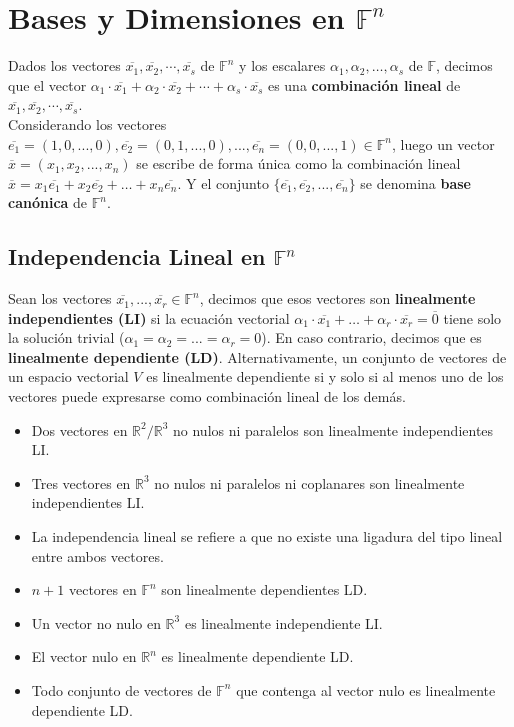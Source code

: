 \documentclass[11pt,a4paper]{article}
\begin{document}
\newpage

\section{Bases y Dimensiones en $\mathbb{F}^n$}
Dados los vectores $\overline{x_1}, \overline{x_2}, \cdots, \overline{x_s}$ de $\mathbb{F}^n$ y los escalares $\alpha_1, \alpha_2, \hdots, \alpha_s$ de $\mathbb{F}$, decimos que el vector $\alpha_1 \cdot \overline{x_1} + \alpha_2 \cdot \overline{x_2} + \cdots + \alpha_s \cdot \overline{x_s}$ es una \textbf{combinaci\'on lineal} de $\overline{x_1}, \overline{x_2}, \cdots, \overline{x_s}$.\\

Considerando los vectores $\overline{e_1} = (1,0,...,0), \overline{e_2} = (0,1,...,0) , ..., \overline{e_n} = (0,0,...,1) \in \mathbb{F}^n$, luego un vector $\overline{x} = (x_1, x_2, ..., x_n)$ se escribe de forma \'unica como la combinaci\'on lineal $\overline{x} = x_1\overline{e_1} + x_2\overline{e_2} + \hdots + x_n\overline{e_n}$. Y el conjunto $\{ \overline{e_1}, \overline{e_2}, ..., \overline{e_n} \}$ se denomina \textbf{base can\'onica} de $\mathbb{F}^n$.

\subsection{Independencia Lineal en $\mathbb{F}^n$}
Sean los vectores $\overline{x_1}, ..., \overline{x_r} \in \mathbb{F}^n$, decimos que esos vectores son \textbf{linealmente independientes (LI)} si la ecuaci\'on vectorial $\alpha_1 \cdot \overline{x_1} + \hdots + \alpha_r \cdot \overline{x_r} = \overline{0}$ tiene solo la soluci\'on trivial ($\alpha_1 = \alpha_2 = ... = \alpha_r = 0$). En caso contrario, decimos que es \textbf{linealmente dependiente (LD)}. Alternativamente, un conjunto de vectores de un espacio vectorial $V$ es linealmente dependiente si y solo si al menos uno de los vectores puede expresarse como combinaci\'on lineal de los dem\'as.
\begin{itemize}
\itemsep-0.3em
\item Dos vectores en $\mathbb{R}^2/\mathbb{R}^3$ no nulos ni paralelos son linealmente independientes LI.
\item Tres vectores en $\mathbb{R}^3$ no nulos ni paralelos ni coplanares son linealmente independientes LI.
\item La independencia lineal se refiere a que no existe una ligadura del tipo lineal entre ambos vectores.
\item $n+1$ vectores en $\mathbb{F}^n$ son linealmente dependientes LD.
\item Un vector no nulo en $\mathbb{R}^3$ es linealmente independiente LI.
\item El vector nulo en $\mathbb{R}^n$ es linealmente dependiente LD.
\item Todo conjunto de vectores de $\mathbb{F}^n$ que contenga al vector nulo es linealmente dependiente LD.
\end{itemize}
\end{document}
